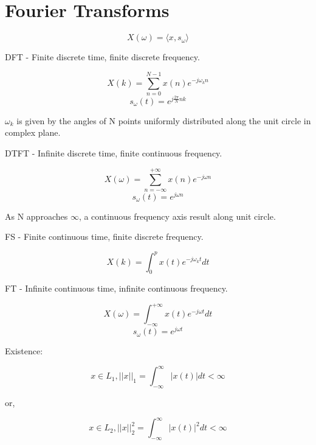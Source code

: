 \documentclass[11pt]{article}
\begin{document}
\section*{Fourier Transforms} \indent

\[X(\omega) = \langle x, s_\omega\rangle\]

DFT - Finite discrete time, finite discrete frequency.

\[X(k) = \sum_{n=0}^{N-1} x(n)e^{-j\omega_kn}\]
\[s_\omega(t) = e^{j\frac{2\pi}{N}nk}\]

$\omega_k$ is given by the angles of N points uniformly distributed along the unit circle in complex plane.

\bigskip

DTFT - Infinite discrete time, finite continuous frequency.

\[X(\omega) = \sum_{n=-\infty}^{+\infty} x(n)e^{-j\omega n}\]
\[s_\omega(t) = e^{j\omega n}\]

As N approaches $\infty$, a continuous frequency axis result along unit circle.

\bigskip

FS - Finite continuous time, finite discrete frequency.

\[X(k) = \int_0^p x(t) e^{-j\omega_kt} dt\]

FT - Infinite continuous time, infinite continuous frequency.

\[X(\omega) = \int_{-\infty}^{+\infty} x(t) e^{-j\omega t} dt\]
\[s_\omega(t) = e^{j\omega t}\]

Existence:

\[x \in L_1, ||x||_1 = \int_{-\infty}^\infty |x(t)| dt < \infty\]

or,

\[x \in L_2, ||x||_2^2 = \int_{-\infty}^\infty |x(t)|^2 dt < \infty\]
\end{document}
